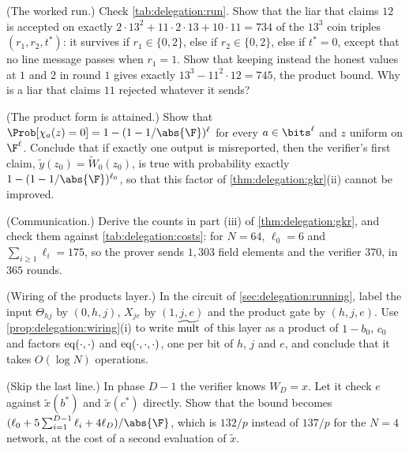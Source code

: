 \begin{refsection}
\begin{exercises}
\item \consolidation (The worked run.) Check \cref{tab:delegation:run}. Show that the liar that claims $12$ is accepted on exactly $2\cdot13^2+11\cdot2\cdot13+10\cdot11=734$ of the $13^3$ coin triples $(r_1,r_2,t^*)$: it survives if $r_1\in\{0,2\}$, else if $r_2\in\{0,2\}$, else if $t^*=0$, except that no line message passes when $r_1=1$. Show that keeping instead the honest values at $1$ and $2$ in round $1$ gives exactly $13^3-11^2\cdot12=745$, the product bound. Why is a liar that claims $11$ rejected whatever it sends?\label{ex:delegation:run}

\item \consolidation (The product form is attained.) Show that $\Prob[\chi_a(z)=0]=1-(1-1/\abs{\F})^\ell$ for every $a\in\bits^\ell$ and $z$ uniform on $\F^\ell$. Conclude that if exactly one output is misreported, then the verifier's first claim, $\tilde y(z_0)=\tilde W_0(z_0)$, is true with probability exactly $1-(1-1/\abs{\F})^{\ell_0}$, so that this factor of \cref{thm:delegation:gkr}(ii) cannot be improved.\label{ex:delegation:chi}

\item \consolidation (Communication.) Derive the counts in part (iii) of \cref{thm:delegation:gkr}, and check them against \cref{tab:delegation:costs}: for $N=64$, $\ell_0=6$ and $\sum_{i\ge1}\ell_i=175$, so the prover sends $1{,}303$ field elements and the verifier $370$, in $365$ rounds.\label{ex:delegation:comm}

\item \consolidation (Wiring of the products layer.) In the circuit of \cref{sec:delegation:running}, label the input $\Theta_{hj}$ by $(0,h,j)$, $X_{je}$ by $(1,j,e)$ and the product gate by $(h,j,e)$. Use \cref{prop:delegation:wiring}(i) to write $\widetilde{\mathrm{mult}}$ of this layer as a product of $1-b_0$, $c_0$ and factors $\mathrm{eq}(\cdot,\cdot)$ and $\mathrm{eq}(\cdot,\cdot,\cdot)$, one per bit of $h$, $j$ and $e$, and conclude that it takes $O(\log N)$ operations.\label{ex:delegation:prodwiring}

\item \variation (Skip the last line.) In phase $D-1$ the verifier knows $W_D=x$. Let it check $e$ against $\tilde x(b^*)$ and $\tilde x(c^*)$ directly. Show that the bound becomes $(\ell_0+5\sum_{i=1}^{D-1}\ell_i+4\ell_D)/\abs{\F}$, which is $132/p$ instead of $137/p$ for the $N=4$ network, at the cost of a second evaluation of $\tilde x$.\label{ex:delegation:lastline}


\end{exercises}
\end{refsection}
